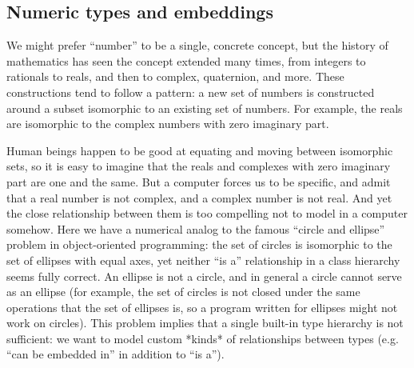 

\subsection{Numeric types and embeddings}

We might prefer ``number'' to be a single,
concrete concept, but the history of mathematics has seen the concept
extended many times, from integers to rationals to reals, and then to complex,
quaternion, and more. These constructions tend to follow a pattern: a new set
of numbers is constructed around a subset isomorphic to an existing set of
numbers. For example, the reals are isomorphic to the complex numbers with
zero imaginary part.

Human beings happen to be good at equating and moving between isomorphic sets,
so it is easy to imagine that the reals and complexes with zero imaginary
part are one and the same. But a computer forces us to be specific, and admit
that a real number is not complex, and a complex number is not real. And yet
the close relationship between them is too compelling not to model in a
computer somehow. Here we have a numerical analog to the famous ``circle and
ellipse'' problem in object-oriented programming: the set of circles is
isomorphic to the set of ellipses with equal axes, yet neither ``is a''
relationship in a class hierarchy seems fully correct. An ellipse is not
a circle, and in general a circle cannot serve as an ellipse (for example,
the set of circles is not closed under the same operations that the set of
ellipses is, so a program written for ellipses might not work on circles).
This problem implies that a single built-in type hierarchy is not
sufficient: we want to model custom *kinds* of relationships between
types (e.g. ``can be embedded in'' in addition to ``is a'').



